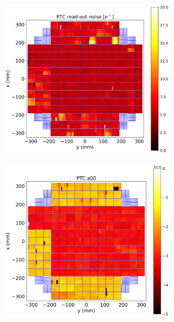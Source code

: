 \begin{figure}[!htb]
\begin{subfigure}[b]{0.49\textwidth}
         \includegraphics[width=\textwidth]{Figures/Focal_plane_noise.png}
     \end{subfigure}
     \vspace{3mm}
     \begin{subfigure}[b]{0.49\textwidth}
         \centering
         \includegraphics[width=\textwidth]{Figures/Focal_plane_a00.png}

\end{subfigure}
\end{figure}
